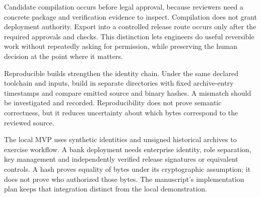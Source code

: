 \documentclass[12pt,a4paper,oneside,openany]{book}
\begin{document}
Candidate compilation occurs before legal approval, because reviewers need a
concrete package and verification evidence to inspect. Compilation does not grant
deployment authority. Export into a controlled release route occurs only after
the required approvals and checks. This distinction lets engineers do useful
reversible work without repeatedly asking for permission, while preserving the
human decision at the point where it matters.

Reproducible builds strengthen the identity chain. Under the same declared
toolchain and inputs, build in separate directories with fixed archive-entry
timestamps and compare emitted source and binary hashes. A mismatch should be
investigated and recorded. Reproducibility does not prove semantic correctness,
but it reduces uncertainty about which bytes correspond to the reviewed source.

The local MVP uses synthetic identities and unsigned historical archives to
exercise workflow. A bank deployment needs enterprise identity, role separation,
key management and independently verified release signatures or equivalent
controls. A hash proves equality of bytes under its cryptographic assumption;
it does not prove who authorized those bytes. The manuscript's implementation
plan keeps that integration distinct from the local demonstration.


\backmatter
\begingroup
\raggedright


\endgroup
\end{document}
